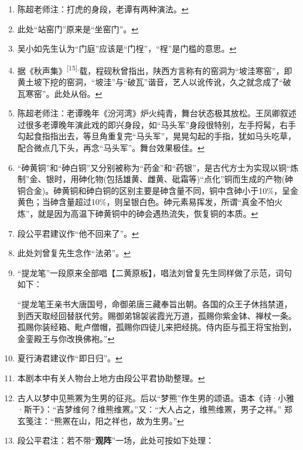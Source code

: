 \begin{enumerate}
\item
  \leavevmode\hypertarget{fn351}{}%
  陈超老师注：打虎的身段，老谭有两种演法。\protect\hyperlink{fnref351}{↩}
\item
  \leavevmode\hypertarget{fn352}{}%
  此处``站窑门''原来是``坐窑门''。\protect\hyperlink{fnref352}{↩}
\item
  \leavevmode\hypertarget{fn353}{}%
  吴小如先生认为``门庭''应该是``门桯''，``桯''是门槛的意思。\protect\hyperlink{fnref353}{↩}
\item
  \leavevmode\hypertarget{fn354}{}%
  据《秋声集》\textsuperscript{{[}15{]}.}载，程砚秋曾指出，陕西方言称有的窑洞为``坡洼寒窑''，即黄土坡下挖的窑洞，``坡洼''与``破瓦''谐音，艺人以讹传讹，久之就念成了``破瓦寒窑''。此处从俗。\protect\hyperlink{fnref354}{↩}
\item
  \leavevmode\hypertarget{fn355}{}%
  陈超老师注：老谭晚年《汾河湾》炉火纯青，舞台状态极其放松。王凤卿叙述过很多老谭晚年演此戏的即兴身段，如``马头军''身段很特别，左手捋髯，右手勾起食指指出去，等旦角重复完``马头军''，晃晃勾起的手指，犹如马头吃草，配合微点几下头，再念``马头军''。舞台效果极佳。\protect\hyperlink{fnref355}{↩}
\item
  \leavevmode\hypertarget{fn356}{}%
  ``砷黄铜''和``砷白铜''又分别被称为``药金''和``药银''，是古代方士为实现以铜``炼制''金、银时，用砷化物(包括雄黄、雌黄、砒霜等)``点化''铜而生成的产物(砷铜合金)。砷黄铜和砷白铜的区别主要是砷含量不同，铜中含砷小于10\%，呈金黄色；当砷含量超过10\%，则呈银白色。砷元素易挥发，所谓``真金不怕火炼''，就是因为高温下砷黄铜中的砷会遇热流失，恢复铜的本质。\protect\hyperlink{fnref356}{↩}
\item
  \leavevmode\hypertarget{fn357}{}%
  段公平君建议作``他不回来了''。\protect\hyperlink{fnref357}{↩}
\item
  \leavevmode\hypertarget{fn358}{}%
  此处刘曾复先生念作``法弟''。\protect\hyperlink{fnref358}{↩}
\item
  \leavevmode\hypertarget{fn359}{}%
  ``提龙笔''一段原来全部唱【二黄原板】，唱法刘曾复先生同样做了示范，词句如下：

  ``提龙笔王亲书大唐国号，命御弟唐三藏奉旨出朝。各国的众王子休挡禁道，到西天取经回替朕代劳。赐御弟锦袈裟霞光万道，孤赐你紫金钵、禅杖一条。孤赐你装经箱、毗卢僧帽，孤赐你四徒儿来把经挑。侍内臣与孤王将宝抬到，金銮殿王与你改换佛袍。''\protect\hyperlink{fnref359}{↩}
\item
  \leavevmode\hypertarget{fn360}{}%
  夏行涛君建议作``即日归''。\protect\hyperlink{fnref360}{↩}
\item
  \leavevmode\hypertarget{fn361}{}%
  本剧本中有关人物台上地方由段公平君协助整理。\protect\hyperlink{fnref361}{↩}
\item
  \leavevmode\hypertarget{fn362}{}%
  古人以梦中见熊罴为生男的征兆。后以``梦熊''作生男的颂语。语本《诗·小雅·斯干》：``吉梦维何？维熊维罴。''又：``大人占之，维熊维罴，男子之祥。''
  郑玄笺注：``熊罴在山，阳之祥也，故为生男。''\protect\hyperlink{fnref362}{↩}
\item
  \leavevmode\hypertarget{fn363}{}%
  段公平君注：若不带``\textbf{观阵}''一场，此处可按如下处理：


\end{enumerate}
